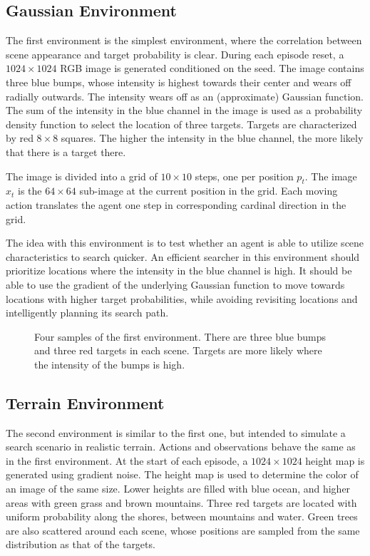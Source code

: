 \subsection{Gaussian Environment}

The first environment is the simplest environment, where the correlation between scene appearance and target probability is clear.
During each episode reset, a \(1024 \times 1024\) RGB image is generated conditioned on the seed.
The image contains three blue bumps, whose intensity is highest towards their center and wears off radially outwards.
The intensity wears off as an (approximate) Gaussian function.
The sum of the intensity in the blue channel in the image is used as a probability density function to select the location of three targets.
Targets are characterized by red \(8 \times 8\) squares.
The higher the intensity in the blue channel, the more likely that there is a target there.

The image is divided into a grid of \(10 \times 10\) steps, one per position \(p_t\).
The image \(x_t\) is the \(64 \times 64\) sub-image at the current position in the grid.
Each moving action translates the agent one step in corresponding cardinal direction in the grid.

The idea with this environment is to test whether an agent is able to utilize scene characteristics to search quicker.
An efficient searcher in this environment should prioritize locations where the intensity in the blue channel is high.
It should be able to use the gradient of the underlying Gaussian function to move towards locations with higher target probabilities, while avoiding revisiting locations and intelligently planning its search path.

\begin{figure}
    \centering
    
    \label{fig:gaussian}
    \caption[Gaussian environment]{Four samples of the first environment. There are three blue bumps and three red targets in each scene. Targets are more likely where the intensity of the bumps is high.}
\end{figure}

\subsection{Terrain Environment}

The second environment is similar to the first one, but intended to simulate a search scenario in realistic terrain.
Actions and observations behave the same as in the first environment.
At the start of each episode, a \(1024 \times 1024\) height map is generated using gradient noise.
The height map is used to determine the color of an image of the same size.
Lower heights are filled with blue ocean, and higher areas with green grass and brown mountains.
Three red targets are located with uniform probability along the shores, between mountains and water.
Green trees are also scattered around each scene, whose positions are sampled from the same distribution as that of the targets.

